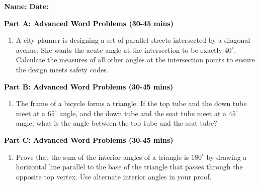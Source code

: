 \documentclass[12pt, letterpaper, fleqn]{article}
\begin{document}
\textbf{Name:} \underline{\hspace{5cm}}
\hfill
\textbf{Date:} \underline{\hspace{3cm}}\\


\begin{tcolorbox}[colback=customteal!20]
\large\textcolor{black}{\textbf{Part A: Advanced Word Problems (30-45 mins)}}
\end{tcolorbox}

\vspace{3mm}

\begin{enumerate}[itemsep=5.5cm, leftmargin=0.6cm]
\item A city planner is designing a set of parallel streets intersected by a diagonal avenue. She wants the acute angle at the intersection to be exactly $40^\circ$. Calculate the measures of all other angles at the intersection points to ensure the design meets safety codes.
\end{enumerate}

\newpage

\begin{tcolorbox}[colback=customteal!20]
\large\textcolor{black}{\textbf{Part B: Advanced Word Problems (30-45 mins)}}
\end{tcolorbox}

\vspace{3mm}

\begin{enumerate}[itemsep=5.5cm, leftmargin=0.6cm, resume]
\item The frame of a bicycle forms a triangle. If the top tube and the down tube meet at a $65^\circ$ angle, and the down tube and the seat tube meet at a $45^\circ$ angle, what is the angle between the top tube and the seat tube?
\end{enumerate}

\newpage

\begin{tcolorbox}[colback=customteal!20]
\large\textcolor{black}{\textbf{Part C: Advanced Word Problems (30-45 mins)}}
\end{tcolorbox}

\vspace{3mm}

\begin{enumerate}[itemsep=5.5cm, leftmargin=0.6cm, resume]
\item Prove that the sum of the interior angles of a triangle is $180^\circ$ by drawing a horizontal line parallel to the base of the triangle that passes through the opposite top vertex. Use alternate interior angles in your proof.
\end{enumerate}
\end{document}
